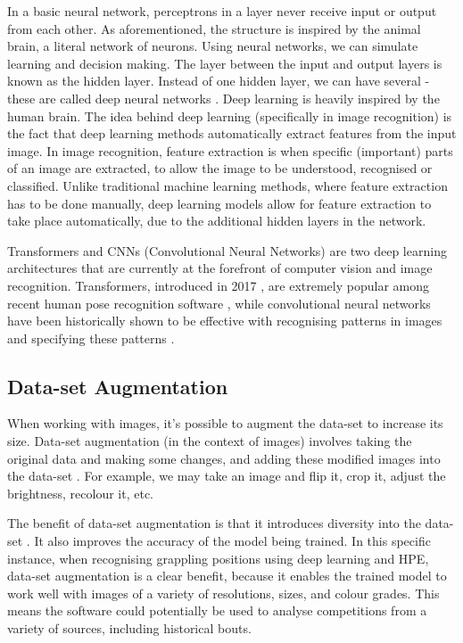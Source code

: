 \documentclass[a4paper, oneside, 11pt]{article}
\begin{document}
In a basic neural network, perceptrons in a layer never receive input or output from each other. As aforementioned, the structure is inspired by the animal brain, a literal network of neurons. Using neural networks, we can simulate learning and decision making. The layer between the input and output layers is known as the hidden layer. Instead of one hidden layer, we can have several - these are called deep neural networks \cite{nielsen2015neural}. Deep learning is heavily inspired by the human brain. The idea behind deep learning (specifically in image recognition) is the fact that deep learning methods automatically extract features from the input image. In image recognition, feature extraction is when specific (important) parts of an image are extracted, to allow the image to be understood, recognised or classified. Unlike traditional machine learning methods, where feature extraction has to be done manually, deep learning models allow for feature extraction to take place automatically, due to the additional hidden layers in the network.

Transformers and CNNs (Convolutional Neural Networks) are two deep learning architectures that are currently at the forefront of computer vision and image recognition. Transformers, introduced in 2017 \cite{TransformersIntro}, are extremely popular among recent human pose recognition software \cite{xu2022vitpose}, while convolutional neural networks have been historically shown to be effective with recognising patterns in images and specifying these patterns \cite{nielsen2015neural}. 

\subsection{Data-set Augmentation}

When working with images, it's possible to augment the data-set to increase its size. Data-set augmentation (in the context of images) involves taking the original data and making some changes, and adding these modified images into the data-set \cite{devries2017dataset}. For example, we may take an image and flip it, crop it, adjust the brightness, recolour it, etc.

The benefit of data-set augmentation is that it introduces diversity into the data-set \cite{devries2017dataset}. It also improves the accuracy of the model being trained. In this specific instance, when recognising grappling positions using deep learning and HPE, data-set augmentation is a clear benefit, because it enables the trained model to work well with images of a variety of resolutions, sizes, and colour grades. This means the software could potentially be used to analyse competitions from a variety of sources, including historical bouts.
\end{document}

